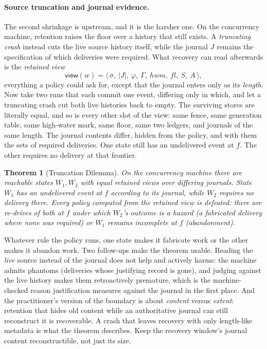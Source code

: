 \documentclass[sigplan,10pt]{acmart}
\theoremstyle{plain}
\newtheorem{theorem}{Theorem}
\theoremstyle{definition}
\newcommand{\view}{\mathsf{view}}          %
\begin{document}
\paragraph{Source truncation and journal evidence.}
The second shrinkage is upstream, and it is the harsher one. On the
concurrency machine, retention raises the floor over a history that
still exists. A \emph{truncating crash} instead cuts the live source
history itself, while the journal $J$ remains the specification of
which deliveries were required. What recovery can read afterwards is the
\emph{retained view}
\[
  \view(w) = \langle\, \sigma,\ |J|,\ \varphi,\ \Gamma,\
  \mathit{hwm},\ \mathit{fl},\ S,\ A \,\rangle ,
\]
everything a policy could ask for, except that the journal enters
only as its \emph{length}. Now take two runs that each commit one
event, differing only in which, and let a truncating crash cut both
live histories back to empty. The surviving stores are literally
equal, and so is every other slot of the view: same fence, same
generation table, same high-water mark, same floor, same two ledgers,
and journals of the same length. The journal contents differ, hidden
from the policy, and with them the sets of required deliveries. One
state still has an undelivered event at $f$. The other requires no
delivery at that frontier.

\begin{theorem}[Truncation Dilemma]\label{thm:trunc}
On the concurrency machine there are reachable states $W_1, W_2$ with
equal retained views over differing journals. State $W_1$ has an undelivered event at $f$
according to its journal, while $W_2$ requires no delivery there. Every
policy computed from the retained view is defeated: there are
re-drives of both at $f$ under which $W_2$'s outcome is a hazard (a
fabricated delivery where none was required) or $W_1$ remains incomplete at $f$
(abandonment).
\end{theorem}

Whatever rule the policy runs, one state makes it fabricate work or
the other makes it abandon work. Two
follow-ups make the theorem usable.
Reading the \emph{live} source instead of the journal does not help
and actively harms: the machine admits phantoms (deliveries whose
justifying record is gone), and judging against the live history makes
them retroactively premature, which is the machine-checked reason
justification measures against the journal in the first place. And
the practitioner's version of the boundary is about \emph{content}
versus \emph{extent}: retention that hides old content while an
authoritative journal can still reconstruct it is recoverable. A
crash that leaves recovery with only length-like metadata is what
the theorem describes. Keep the recovery window's journal content
reconstructible, not just its size.
\end{document}
